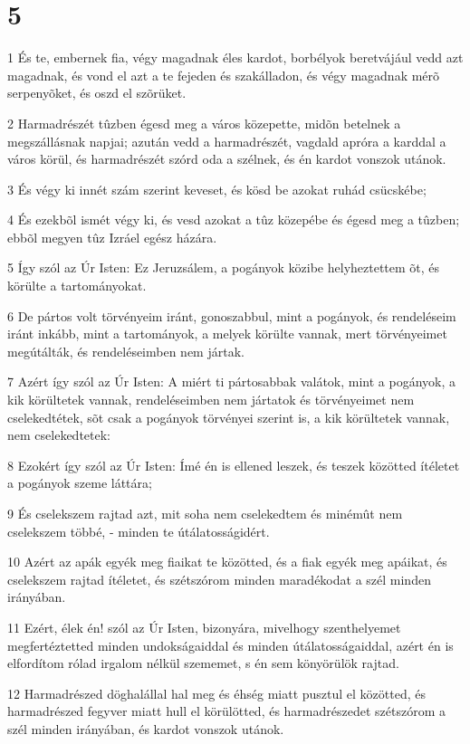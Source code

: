 \chapter{5}

\par 1 És te, embernek fia, végy magadnak éles kardot, borbélyok beretvájául vedd azt magadnak, és vond el azt a te fejeden és szakálladon, és végy magadnak mérõ serpenyõket, és oszd el szõrüket.
\par 2 Harmadrészét tûzben égesd meg a város közepette, midõn betelnek a megszállásnak napjai; azután vedd a harmadrészét, vagdald apróra a karddal a város körül, és harmadrészét szórd oda a szélnek, és én kardot vonszok utánok.
\par 3 És végy ki innét szám szerint keveset, és kösd be azokat ruhád csücskébe;
\par 4 És ezekbõl ismét végy ki, és vesd azokat a tûz közepébe és égesd meg a tûzben; ebbõl megyen tûz Izráel egész házára.
\par 5 Így szól az Úr Isten: Ez Jeruzsálem, a pogányok közibe helyheztettem õt, és körülte a tartományokat.
\par 6 De pártos volt törvényeim iránt, gonoszabbul, mint a pogányok, és rendeléseim iránt inkább, mint a tartományok, a melyek körülte vannak, mert törvényeimet megútálták, és rendeléseimben nem jártak.
\par 7 Azért így szól az Úr Isten: A miért ti pártosabbak valátok, mint a pogányok, a kik körültetek vannak, rendeléseimben nem jártatok és törvényeimet nem cselekedtétek, sõt csak a pogányok törvényei szerint is, a kik körültetek vannak, nem cselekedtetek:
\par 8 Ezokért így szól az Úr Isten: Ímé én is ellened leszek, és teszek közötted ítéletet a pogányok szeme láttára;
\par 9 És cselekszem rajtad azt, mit soha nem cselekedtem és minémût nem cselekszem többé, - minden te útálatosságidért.
\par 10 Azért az apák egyék meg fiaikat te közötted, és a fiak egyék meg apáikat, és cselekszem rajtad ítéletet, és szétszórom minden maradékodat a szél minden irányában.
\par 11 Ezért, élek én! szól az Úr Isten, bizonyára, mivelhogy szenthelyemet megfertéztetted minden undokságaiddal és minden útálatosságaiddal, azért én is elfordítom rólad irgalom nélkül szememet, s én sem könyörülök rajtad.
\par 12 Harmadrészed döghalállal hal meg és éhség miatt pusztul el közötted, és harmadrészed fegyver miatt hull el körülötted, és harmadrészedet szétszórom a szél minden irányában, és kardot vonszok utánok.
